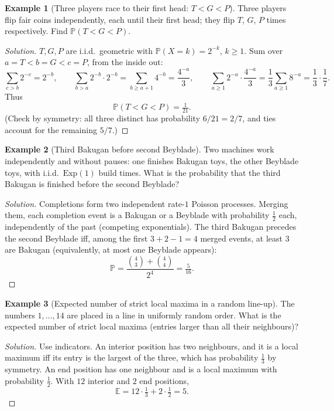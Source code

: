 \documentclass[11pt]{article}
\theoremstyle{definition}
\newtheorem{example}{Example}[section]
\newcommand{\E}{\mathbb{E}}
\begin{document}
\begin{example}[Three players race to their first head: $T<G<P$]
Three players flip fair coins independently, each until their first head; they flip $T$, $G$, $P$ times respectively. Find $\mathbb P(T<G<P)$.
\end{example}

\begin{proof}[Solution]
$T,G,P$ are i.i.d.\ geometric with $\mathbb P(X=k)=2^{-k}$, $k\ge1$. Sum over $a=T<b=G<c=P$, from the inside out:
\[
\sum_{c>b}2^{-c}=2^{-b},\qquad \sum_{b>a}2^{-b}\cdot2^{-b}=\sum_{b\ge a+1}4^{-b}=\frac{4^{-a}}{3},\qquad\sum_{a\ge1}2^{-a}\cdot\frac{4^{-a}}3=\frac13\sum_{a\ge1}8^{-a}=\frac13\cdot\frac17 .
\]
Thus
\[
\mathbb P(T<G<P)=\boxed{\tfrac1{21}}.
\]
(Check by symmetry: all three distinct has probability $6/21=2/7$, and ties account for the remaining $5/7$.)
\end{proof}

\begin{example}[Third Bakugan before second Beyblade]
Two machines work independently and without pauses: one finishes Bakugan toys, the other Beyblade toys, with i.i.d.\ $\mathrm{Exp}(1)$ build times. What is the probability that the third Bakugan is finished before the second Beyblade?
\end{example}

\begin{proof}[Solution]
Completions form two independent rate-$1$ Poisson processes. Merging them, each completion event is a Bakugan or a Beyblade with probability $\tfrac12$ each, independently of the past (competing exponentials). The third Bakugan precedes the second Beyblade iff, among the first $3+2-1=4$ merged events, at least $3$ are Bakugan (equivalently, at most one Beyblade appears):
\[
\mathbb P=\frac{\binom43+\binom44}{2^4}=\boxed{\tfrac5{16}}.
\]
\end{proof}

\begin{example}[Expected number of strict local maxima in a random line-up]
The numbers $1,\dots,14$ are placed in a line in uniformly random order. What is the expected number of strict local maxima (entries larger than all their neighbours)?
\end{example}

\begin{proof}[Solution]
Use indicators. An interior position has two neighbours, and it is a local maximum iff its entry is the largest of the three, which has probability $\tfrac13$ by symmetry. An end position has one neighbour and is a local maximum with probability $\tfrac12$. With $12$ interior and $2$ end positions,
\[
\E=12\cdot\tfrac13+2\cdot\tfrac12=\boxed{5}.
\]
\end{proof}
\end{document}
